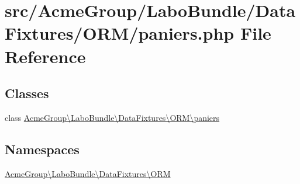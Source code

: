 \hypertarget{paniers_8php}{\section{src/\+Acme\+Group/\+Labo\+Bundle/\+Data\+Fixtures/\+O\+R\+M/paniers.php File Reference}
\label{paniers_8php}
}
\subsection*{Classes}
\begin{DoxyCompactItemize}
\item 
class \hyperlink{class_acme_group_1_1_labo_bundle_1_1_data_fixtures_1_1_o_r_m_1_1paniers}{Acme\+Group\textbackslash{}\+Labo\+Bundle\textbackslash{}\+Data\+Fixtures\textbackslash{}\+O\+R\+M\textbackslash{}paniers}
\end{DoxyCompactItemize}
\subsection*{Namespaces}
\begin{DoxyCompactItemize}
\item 
 \hyperlink{namespace_acme_group_1_1_labo_bundle_1_1_data_fixtures_1_1_o_r_m}{Acme\+Group\textbackslash{}\+Labo\+Bundle\textbackslash{}\+Data\+Fixtures\textbackslash{}\+O\+R\+M}
\end{DoxyCompactItemize}
